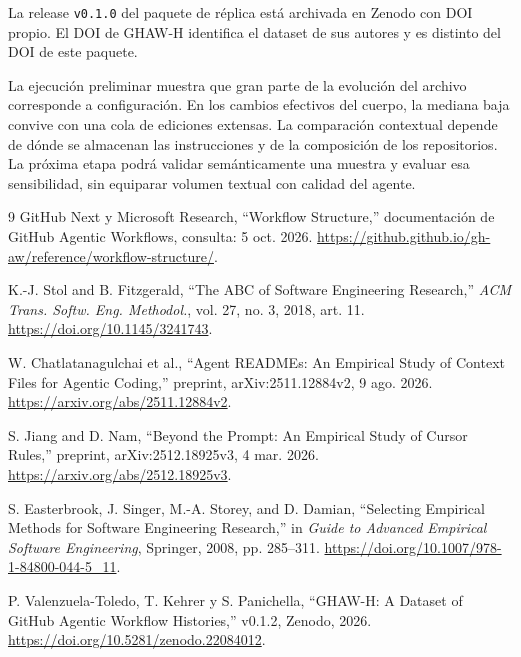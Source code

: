 \documentclass[conference,a4paper]{IEEEtran}
\newcommand{\corr}[1]{{\color{correccion}#1}}
\begin{document}
La release \texttt{v0.1.0} del paquete de réplica está archivada en Zenodo con DOI propio. El DOI de GHAW-H \cite{ghawh} identifica el dataset de sus autores y es distinto del DOI de este paquete.

La ejecución preliminar muestra que gran parte de la evolución del archivo corresponde a configuración. En los cambios efectivos del cuerpo, la mediana baja convive con una cola de ediciones extensas. La comparación contextual depende de dónde se almacenan las instrucciones y de la composición de los repositorios. La próxima etapa podrá validar semánticamente una muestra y evaluar esa sensibilidad, sin equiparar volumen textual con calidad del agente.

\clearpage
\begin{thebibliography}{9}
GitHub Next y Microsoft Research, ``Workflow Structure,'' documentación de GitHub Agentic Workflows, consulta: 5 oct. 2026. \url{https://github.github.io/gh-aw/reference/workflow-structure/}.

K.-J. Stol and B. Fitzgerald, ``The ABC of Software Engineering Research,'' \textit{ACM Trans. Softw. Eng. Methodol.}, vol. 27, no. 3, 2018, art. 11. \url{https://doi.org/10.1145/3241743}.

W. Chatlatanagulchai et al., ``Agent READMEs: An Empirical Study of Context Files for Agentic Coding,'' preprint, arXiv:2511.12884v2, 9 ago. 2026. \url{https://arxiv.org/abs/2511.12884v2}.

S. Jiang and D. Nam, ``Beyond the Prompt: An Empirical Study of Cursor Rules,'' \corr{preprint, arXiv:2512.18925v3, 4 mar. 2026}. \url{https://arxiv.org/abs/2512.18925v3}.

S. Easterbrook, J. Singer, M.-A. Storey, and D. Damian, ``Selecting Empirical Methods for Software Engineering Research,'' in \textit{Guide to Advanced Empirical Software Engineering}, Springer, 2008, pp. 285--311. \url{https://doi.org/10.1007/978-1-84800-044-5_11}.

P. Valenzuela-Toledo, T. Kehrer y S. Panichella, ``GHAW-H: A Dataset of GitHub Agentic Workflow Histories,'' v0.1.2, Zenodo, 2026. \url{https://doi.org/10.5281/zenodo.22084012}.
\end{thebibliography}
\end{document}
